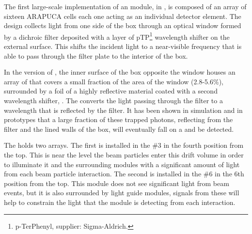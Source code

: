 
The first large-scale implementation of an  module, in , is composed of an array of sixteen ARAPUCA cells each one acting as an individual detector element. 
The  design collects light from one side of the box through an optical window formed by a dichroic filter deposited with a layer of pTP\footnote{p-TerPhenyl, supplier: Sigma-Aldrich\textregistered.}
wavelength shifter on the external surface. This shifts the incident  light to a near-visible frequency that is able to pass through the filter plate to the interior of the box.  

In the  version of , the inner surface of the box opposite the window houses an array of  that covers a small fraction of the area of the window (2.8-5.6\%), surrounded by a foil of a highly reflective material coated with a second wavelength shifter, . The  converts the light passing through the filter to a wavelength that is reflected by the filter. It has been shown in simulation and in prototypes that a large fraction of these trapped photons, reflecting from the filter and the lined walls of the box, will eventually fall on a  and be detected.

The  holds two  arrays. The first is installed in the  \#3 in the fourth position from the top.  This is near the level the beam particles enter this drift volume in order to illuminate it and the surrounding modules with a significant amount of light from each beam particle interaction.
The second  is installed in the  \#6 in the 6th position from the top.  This module does not see significant light from beam events, but it is also surrounded by light guide modules, signals from these will help to constrain the light that the module is detecting from each interaction.
 
